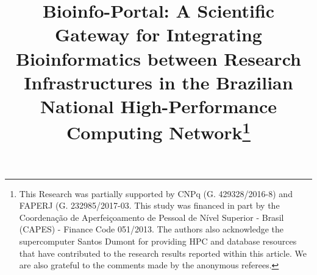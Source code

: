 \documentclass[3p,times]{elsarticle}
\begin{document}
\def\system {\texttt{BioinfoPortal}\xspace}
\def\sci {\texttt{SciPhy}\xspace}
\def\swift {\texttt{SwiftGecko}\xspace}
\def\raxml {\texttt{RAxML}\xspace}

 
 \begin{frontmatter}


\dochead{}


\title{Bioinfo-Portal: A Scientific Gateway for Integrating Bioinformatics between Research Infrastructures in the Brazilian National High-Performance Computing Network\footnote{This Research was partially supported by CNPq (G. 429328/2016-8) and FAPERJ (G. 232985/2017-03. This study was financed in part by the Coordenação de Aperfeiçoamento de Pessoal de Nível Superior - Brasil (CAPES) - Finance Code 051/2013. The authors also acknowledge the supercomputer Santos Dumont for providing HPC and database resources that have contributed to the research results reported within this article. We are also grateful to the comments made by the anonymous referees.}}




\end{frontmatter}
\end{document}
